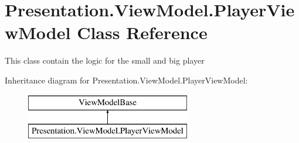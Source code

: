 \hypertarget{class_presentation_1_1_view_model_1_1_player_view_model}{}\section{Presentation.\+View\+Model.\+Player\+View\+Model Class Reference}
\label{class_presentation_1_1_view_model_1_1_player_view_model}


This class contain the logic for the small and big player  


Inheritance diagram for Presentation.\+View\+Model.\+Player\+View\+Model\+:\begin{figure}[H]
\begin{center}
\leavevmode
\includegraphics[height=2.000000cm]{class_presentation_1_1_view_model_1_1_player_view_model}
\end{center}
\end{figure}
